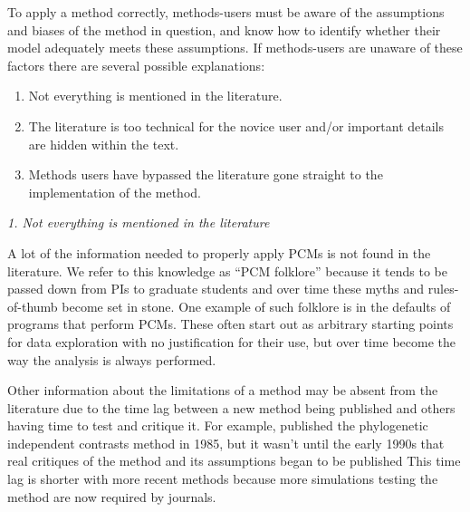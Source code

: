 \documentclass[a4paper,12pt]{article}
\renewcommand{\subsection}[1]{
  \bigskip
  \begin{center}
  \begin{large}
  \normalfont\itshape #1
  \end{large}
  \end{center}
}
\begin{document}
To apply a method correctly, methods-users must be aware of the assumptions and biases of the method in question, and know how to identify whether their model adequately meets these assumptions. If methods-users are unaware of these factors there are several possible explanations:

\begin{enumerate}
\item Not everything is mentioned in the literature.
\item The literature is too technical for the novice user and/or important details are hidden within the text.
\item Methods users have bypassed the literature gone straight to the implementation of the method.
\end{enumerate}


\subsection{1. Not everything is mentioned in the literature}

A lot of the information needed to properly apply PCMs is not found in the literature. 
We refer to this knowledge as ``PCM folklore'' because it tends to be passed down from PIs to graduate students and over time these myths and rules-of-thumb become set in stone. 
One example of such folklore is in the defaults of programs that perform PCMs. 
These often start out as arbitrary starting points for data exploration with no justification for their use, but over time become the way the analysis is always performed.


Other information about the limitations of a method may be absent from the literature due to the time lag between a new method being published and others having time to test and critique it. 
For example, \citealp{felsenstein1985phylogenies} published the phylogenetic independent contrasts method in 1985, but it wasn't until the early 1990s that real critiques of the method and its assumptions began to be published %
This time lag is shorter with more recent methods because more simulations testing the method are now required by journals.
\end{document}
